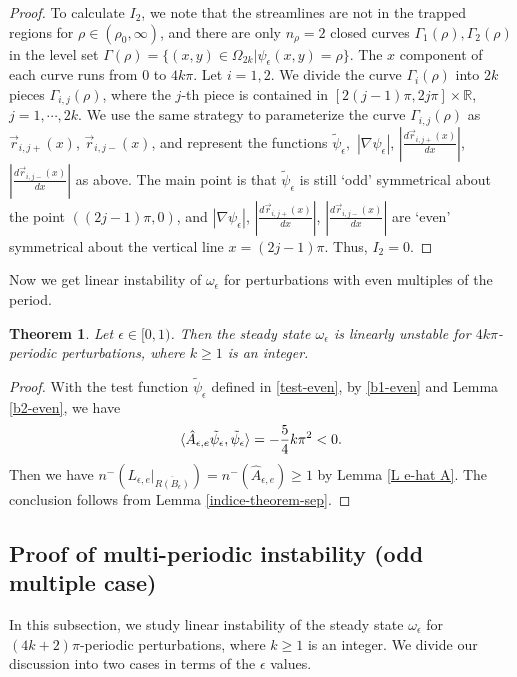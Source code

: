 \documentclass[1 [leqno, 11pt]{amsart}
\numberwithin{equation}{section}
\let\ep=\epsilon
\newtheorem{Theorem}{Theorem}[section]
\begin{document}
\begin{CJK*}{GBK}{song}
\begin{proof}
To calculate $I_2$, we note that the streamlines are not in the trapped regions for   $\rho\in(\rho_0,\infty)$, and there are only $n_\rho = 2$ closed curves $\Gamma_1(\rho), \Gamma_2(\rho)$ in the level set $\Gamma(\rho) = \{(x, y) \in \Omega_{2k} | \psi_\ep(x,y) = \rho\}$. The $x$ component of each curve runs from $0$ to  $4k\pi$. Let $i=1,2$. We divide the curve $\Gamma_i(\rho)$ into $2k$ pieces $\Gamma_{i,j}(\rho)$, where the $j$-th piece is contained in $[2(j-1)\pi,2j\pi]\times \mathbb{R}$, $j=1,\cdots, 2k$. We use the same  strategy to parameterize the curve $\Gamma_{i,j}(\rho)$ as $ \vec{r}_{i,j+}(x)$, $\vec{r}_{i,j-}(x)$, and  represent the functions $\tilde{\psi}_\ep,$ $|\nabla \psi_\ep|$, $\left|\frac{d \vec{r}_{i,j+}(x)}{dx}\right|$, $\left|\frac{d \vec{r}_{i,j-}(x)}{dx}\right|$ as above.  The main point is that
$\tilde{\psi}_\ep$ is still   `odd'   symmetrical about the point $( (2j-1)\pi,0)$, and
$|\nabla \psi_\ep|$, $\left|\frac{d \vec{r}_{i,j+}(x)}{dx}\right|$, $\left|\frac{d \vec{r}_{i,j-}(x)}{dx}\right|$ are `even'    symmetrical about the vertical line $x=(2j-1)\pi$. Thus, $I_2 = 0$.
\fi
\end{proof}
Now we get linear instability of $\omega_\ep$ for perturbations with even multiples of the period.
\begin{Theorem}\label{multi-even}
Let $\ep\in[0,1)$. Then the steady state $\omega_\ep$ is linearly unstable for $4k\pi$-periodic perturbations, where $k\geq1$ is an integer.
\end{Theorem}
\begin{proof}
With the test function $\tilde{\psi}_\ep$ defined in \eqref{test-even}, by \eqref{b1-even} and Lemma \ref{b2-even}, we have
$$\langle\hat{A}_{\ep,e} \tilde{\psi}_\ep, \tilde{\psi}_\ep \rangle = -{5\over4}k\pi^2 < 0.$$
Then we have
$n^-\left( L_{\ep,e} |_{\overline{R(B_\ep)}} \right) = n^-\left(\hat{A}_{\ep,e}\right)\geq1$ by Lemma \ref{L e-hat A}.  The conclusion follows from  Lemma  \ref{indice-theorem-sep}.
\end{proof}

\subsection{Proof of multi-periodic instability  (odd multiple case)}
In this subsection, we study linear instability of the steady state $\omega_\ep$ for   $(4k+2)\pi$-periodic  perturbations, where $k\geq1$ is an integer.
We divide our discussion into two cases in terms of the $\ep$ values.
\medskip


\end{CJK*}
\end{document}
